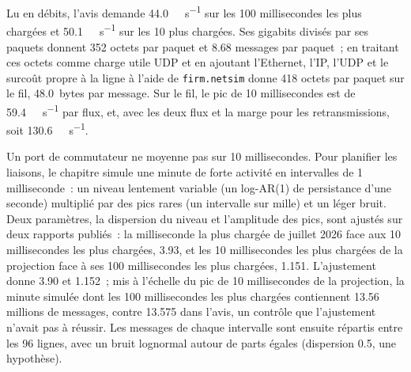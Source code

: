 Lu en débits, l'avis demande \qty{44.0}{\giga\bit\per\second} sur les 100 millisecondes les plus chargées et
\qty{50.1}{\giga\bit\per\second} sur les 10 plus chargées. Ses gigabits divisés par ses paquets donnent 352 octets par paquet et 8.68
messages par paquet~; en traitant ces octets comme charge utile UDP et en ajoutant l'Ethernet, l'IP, l'UDP et le surcoût propre à la ligne à l'aide de
\texttt{firm.netsim} donne 418 octets par paquet sur le fil, \qty{48.0}{bytes} par message. Sur le fil, le pic de 10 millisecondes
est de \qty{59.4}{\giga\bit\per\second} par flux, et, avec les deux flux et la marge pour les retransmissions,
soit \qty{130.6}{\giga\bit\per\second}.

Un port de commutateur ne moyenne pas sur 10 millisecondes. Pour planifier les liaisons, le chapitre simule une minute de forte activité en
intervalles de 1 milliseconde~: un niveau lentement variable (un log-AR(1) de persistance d'une seconde) multiplié par des pics rares (un intervalle sur mille) et un
léger bruit. Deux paramètres, la dispersion du niveau et l'amplitude des pics, sont ajustés sur deux rapports publiés~: la
milliseconde la plus chargée de juillet 2026 face aux 10 millisecondes les plus chargées, 3.93, et les 10 millisecondes les plus chargées de la projection face à
ses 100 millisecondes les plus chargées, 1.151. L'ajustement donne 3.90 et 1.152~; mis à l'échelle du pic de 10 millisecondes de la projection, la minute simulée
dont les 100 millisecondes les plus chargées contiennent 13.56 millions de messages, contre 13.575 dans l'avis, un contrôle que l'ajustement n'avait pas à réussir. Les
messages de chaque intervalle sont ensuite répartis entre les 96 lignes, avec un bruit lognormal autour de parts égales (dispersion 0.5, une hypothèse).

\label{lst:nw:equities-and-options-connectivity:burst}

